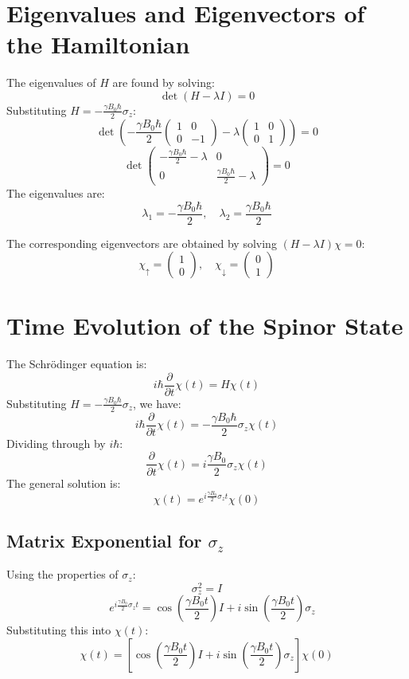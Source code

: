 \documentclass[a4paper,12pt]{article}
\begin{document}
\begin{multicols}{2}
\section*{Eigenvalues and Eigenvectors of the Hamiltonian}
The eigenvalues of $H$ are found by solving:
\[
\det(H - \lambda I) = 0
\]
Substituting $H = -\frac{\gamma B_0 \hbar}{2} \sigma_z$:
\[
\det\left(-\frac{\gamma B_0 \hbar}{2} \begin{pmatrix} 1 & 0 \\ 0 & -1 \end{pmatrix} - \lambda \begin{pmatrix} 1 & 0 \\ 0 & 1 \end{pmatrix}\right) = 0
\]
\[
\det\begin{pmatrix} -\frac{\gamma B_0 \hbar}{2} - \lambda & 0 \\ 0 & \frac{\gamma B_0 \hbar}{2} - \lambda \end{pmatrix} = 0
\]
The eigenvalues are:
\[
\lambda_1 = -\frac{\gamma B_0 \hbar}{2}, \quad \lambda_2 = \frac{\gamma B_0 \hbar}{2}
\]

The corresponding eigenvectors are obtained by solving $(H - \lambda I)\chi = 0$:
\[
\chi_\uparrow = \begin{pmatrix} 1 \\ 0 \end{pmatrix}, \quad \chi_\downarrow = \begin{pmatrix} 0 \\ 1 \end{pmatrix}
\]

\section*{Time Evolution of the Spinor State}
The Schrödinger equation is:
\[
i \hbar \frac{\partial}{\partial t} \chi(t) = H \chi(t)
\]
Substituting $H = -\frac{\gamma B_0 \hbar}{2} \sigma_z$, we have:
\[
i \hbar \frac{\partial}{\partial t} \chi(t) = -\frac{\gamma B_0 \hbar}{2} \sigma_z \chi(t)
\]
Dividing through by $i \hbar$:
\[
\frac{\partial}{\partial t} \chi(t) = i \frac{\gamma B_0}{2} \sigma_z \chi(t)
\]
The general solution is:
\[
\chi(t) = e^{i \frac{\gamma B_0}{2} \sigma_z t} \chi(0)
\]

\subsection*{Matrix Exponential for $\sigma_z$}
Using the properties of $\sigma_z$:
\[
\sigma_z^2 = I
\]
\[
\quad e^{i \frac{\gamma B_0}{2} \sigma_z t} = \cos\left(\frac{\gamma B_0 t}{2}\right) I + i \sin\left(\frac{\gamma B_0 t}{2}\right) \sigma_z
\]
Substituting this into $\chi(t)$:
\[
\chi(t) = \left[\cos\left(\frac{\gamma B_0 t}{2}\right) I + i \sin\left(\frac{\gamma B_0 t}{2}\right) \sigma_z \right] \chi(0)
\]


\end{multicols}
\end{document}

